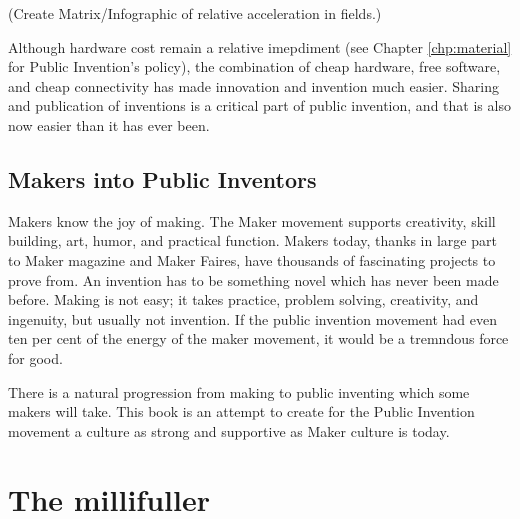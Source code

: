 \documentclass[
	fontsize=10pt, %
	twoside=false, %
	secnumdepth=1, %
]{kaobook}
\begin{document}
(Create Matrix/Infographic of relative acceleration in fields.)

Although hardware cost remain a relative imepdiment
(see Chapter \ref{chp:material} for Public Invention's policy),
the combination of cheap hardware, free software, and
cheap connectivity has made innovation and invention much easier.
Sharing and publication of inventions is a
critical part of public invention, and that is also
now easier than it has ever been.


\section{Makers into Public Inventors}

Makers know the joy of making.
The Maker movement supports creativity, skill building,
art, humor, and practical function.
Makers today, thanks in large part to Maker magazine
and Maker Faires, have thousands of fascinating
projects to prove from.
An invention has to be something novel
which has never been made before.
Making is not easy; it takes practice, problem solving, creativity,
and ingenuity, but usually not invention.
If the public invention movement had even ten per cent
of the energy of the maker movement, it would be a
tremndous force for good.

There is a natural progression from making to
public inventing which some makers will take.
This book is an attempt to create
for the Public Invention movement
a culture as strong and supportive as
Maker culture is today.


\chapter{The millifuller}
\end{document}
